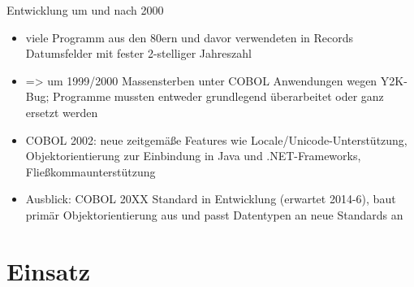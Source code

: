 \documentclass[handout]{beamer}
\begin{document}
\begin{frame}{Entwicklung um und nach 2000}
	\begin{itemize}[<+->]
		\item
			viele Programm aus den 80ern und davor verwendeten in Records Datumsfelder mit fester 2-stelliger Jahreszahl
		\item
			=> um 1999/2000 Massensterben unter COBOL Anwendungen wegen Y2K-Bug; Programme mussten entweder grundlegend überarbeitet oder ganz ersetzt werden
		\item
			COBOL 2002: neue zeitgemäße Features wie Locale/Unicode-Unterstützung, Objektorientierung zur Einbindung in Java und .NET-Frameworks, Fließkommaunterstützung
		\item
			Ausblick: COBOL 20XX Standard in Entwicklung (erwartet 2014-6), baut primär Objektorientierung aus und passt Datentypen an neue Standards an
		\end{itemize}
\end{frame}


\section{Einsatz}
\end{document}
